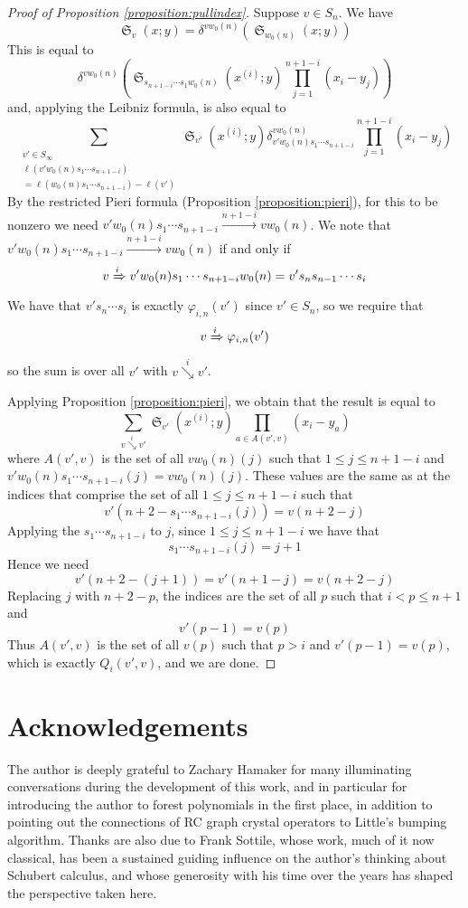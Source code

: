 \documentclass{amsart}
\theoremstyle{definition}
\theoremstyle{remark}
\numberwithin{equation}{subsection}
\DeclareMathOperator{\sch}{\mathfrak{S}}
\newcommand{\downvar}[1]{\stackrel{#1}{\searrow}}
\newcommand{\tom}[1]{\xrightarrow{#1}}
\newcommand{\Tom}[1]{\xRightarrow{#1}}
\newcommand{\ddv}[1]{\delta}
\begin{document}
\begin{proof}[Proof of Proposition \ref{proposition:pullindex}]
Suppose $v\in S_n$. We have
$$\sch_v(x;y)=\ddv{y}^{vw_0(n)}(\sch_{w_0(n)}(x;y))$$
This is equal to
$$\ddv{y}^{vw_0(n)}\left(\sch_{s_{n+1-i}\cdots s_1w_0(n)}(x^{(i)};y)\prod_{j=1}^{n+1-i}(x_i - y_j)\right)$$
and, applying the Leibniz formula, is also equal to
$$\sum_{\substack{v'\in S_\infty\\\ell(v'w_0(n)s_1\cdots s_{n+1-i})\\=\ell(w_0(n)s_1\cdots s_{n+1-i})-\ell(v')}}\sch_{v'}(x^{(i)};y)\ddv{y}_{v'w_0(n)s_1\cdots s_{n+1-i}}^{vw_0(n)}\prod_{j=1}^{n+1-i}(x_i - y_j)$$
By the restricted Pieri formula (Proposition \ref{proposition:pieri}), for this to be nonzero we need $v'w_0(n)s_1\cdots s_{n+1-i}\allowbreak\tom{n+1-i}vw_0(n)$. We note that $v'w_0(n)s_1\cdots s_{n+1-i}\tom{n+1-i}vw_0(n)$ if and only if 
$$v\Tom{i}v'w_0(n)s_1\cdots s_{n+1-i}w_0(n)=v's_ns_{n-1}\cdots s_i$$
We have that $v's_n\cdots s_i$ is exactly $\varphi_{i,n}(v')$ since $v'\in S_n$, so we require that
$$v\Tom{i}\varphi_{i,n}(v')$$
so the sum is over all $v'$ with $v\downvar{i} v'$.

Applying Proposition \ref{proposition:pieri}, we obtain that the result is equal to
$$\sum_{v\downvar{i} v'} \sch_{v'}(x^{(i)};y)\prod_{a\in A(v',v)}(x_i - y_a)$$
where $A(v',v)$ is the set of all $vw_0(n)(j)$ such that $1\leq j\leq n+1-i$ and $v'w_0(n)s_1\cdots s_{n+1-i}(j)=vw_0(n)(j)$. These values are the same as at the indices that comprise the set of all $1\leq j\leq n+1-i$ such that
$$v'(n+2-s_1\cdots s_{n+1-i}(j))=v(n+2-j)$$
Applying the $s_1\cdots s_{n+1-i}$ to $j$, since $1\leq j\leq n+1-i$ we have that 
$$s_1\cdots s_{n+1-i}(j)=j+1$$
Hence we need
$$v'(n+2-(j+1))=v'(n+1-j)=v(n+2-j)$$
Replacing $j$ with $n+2-p$, the indices are the set of all $p$ such that $i<p\leq n+1$ and
$$v'(p-1)=v(p)$$
Thus $A(v',v)$ is the set of all $v(p)$ such that $p>i$ and $v'(p-1)=v(p)$, which is exactly $Q_i(v',v)$, and we are done.
\end{proof}

\section*{Acknowledgements}

The author is deeply grateful to Zachary Hamaker for many illuminating conversations during the development of this work, and in particular for introducing the author to forest polynomials in the first place, in addition to pointing out the connections of RC graph crystal operators to  Little's bumping algorithm. Thanks are also due to Frank Sottile, whose work, much of it now classical, has been a sustained guiding influence on the author's thinking about Schubert calculus, and whose generosity with his time over the years has shaped the perspective taken here.



\end{document}
